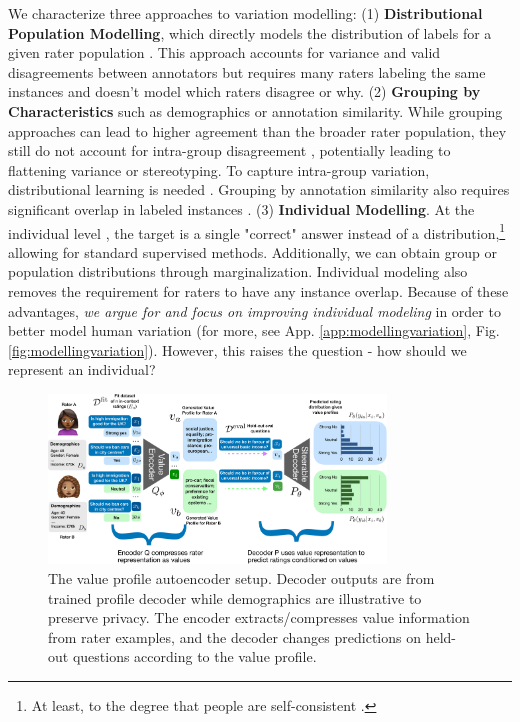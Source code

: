 \documentclass[11pt]{article}
\begin{document}
We characterize three approaches to variation modelling:
(1) {\textbf{Distributional Population Modelling}}, which directly models the distribution of labels for a given rater population \citep{zhang2024divergingpreferencesannotatorsdisagree, siththaranjan2024distributionalpreferencelearningunderstanding}. This approach accounts for variance and valid disagreements between annotators but requires many raters labeling the same instances and doesn't model which raters disagree or why. (2)  {\textbf{Grouping by Characteristics}} such as demographics or annotation similarity. While grouping approaches can lead to higher agreement than the broader rater population, they still do not account for intra-group disagreement \citep{hwang2023aligninglanguagemodelsuser, prabhakaran-etal-2024-grasp}, potentially leading to flattening variance or stereotyping.
To capture intra-group variation, distributional learning is needed \citep{meister2024benchmarkingdistributionalalignmentlarge}.
Grouping by annotation similarity also requires significant overlap in labeled instances \citep{li-etal-2024-steerability}.
(3) {\textbf{ Individual Modelling}}. At the individual level \citep{Gordon_2022, jiang2024languagemodelsreasonindividualistic}, the target is a single "correct" answer instead of a distribution,\footnote{ At least, to the degree that people are self-consistent \citep{abercrombie2023consistencykeydisentanglinglabel}.} allowing for standard supervised methods.
Additionally, we can obtain group or population distributions through marginalization. Individual modeling also removes the requirement for raters to have any instance overlap. 
Because of these advantages, \textit{we argue for and focus on improving individual modeling} in order to better model human variation
(for more, see App. \ref{app:modellingvariation}, Fig. \ref{fig:modellingvariation}).
However, this raises the question - how should we represent an individual?

\begin{figure}[t]
\centering
\includegraphics[width=0.8\textwidth]{files/vp_roma_new.pdf}
\caption{The value profile autoencoder setup. Decoder outputs are from trained profile decoder while demographics are illustrative to preserve privacy. The encoder extracts/compresses value information from rater examples, and the decoder changes predictions on held-out questions according to the value profile.
}
\label{fig:my_label}
\end{figure}
\end{document}
